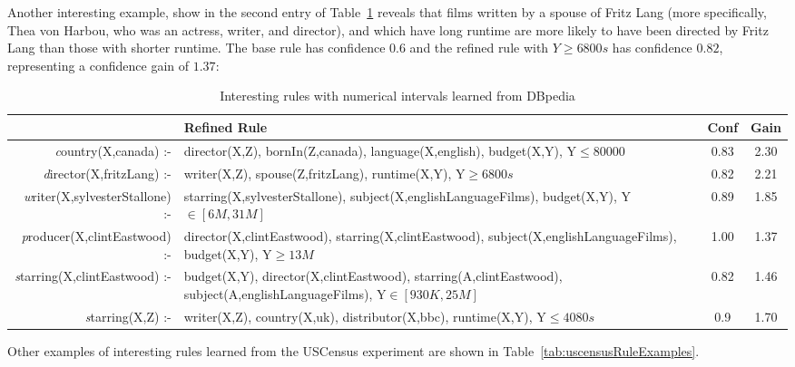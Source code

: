 Another interesting example, show  in the second entry of Table~\ref{tab:mdbRuleExamples} reveals that films written by
a spouse of Fritz Lang (more specifically, Thea von Harbou, who was an actress, writer, and director), and which have
long runtime are more likely to have been directed by Fritz Lang than those with shorter runtime. The base rule has
confidence $0.6$ and the refined rule with $Y\geq 6800s$ has confidence $0.82$, representing a confidence gain of
$1.37$:

\begin{table}[h!]
 \begin{center}
 \caption{Interesting rules with numerical intervals learned from DBpedia}
  \begin{tabular}{ >{\emph}r >{\raggedright}p{7cm} | c | c }
    \toprule
      & Refined Rule				& Conf 	& Gain \\
    \midrule
      country(X,canada) :-&director(X,Z), bornIn(Z,canada), language(X,english), budget(X,Y), Y$\leq 80000$ &
      0.83	& 2.30 \\ \hline
      director(X,fritzLang) :-&writer(X,Z), spouse(Z,fritzLang), runtime(X,Y), Y$\geq 6800s$ & 
      0.82	& 2.21 \\ \hline
      writer(X,sylvesterStallone) :-&starring(X,sylvesterStallone), subject(X,englishLanguageFilms),
      budget(X,Y), Y$\in [6M,31M]$ &
      0.89	& 1.85 \\ \hline
      producer(X,clintEastwood) :-&director(X,clintEastwood), starring(X,clintEastwood),
      subject(X,englishLanguageFilms), budget(X,Y), Y$\geq 13M$ &
      1.00	& 1.37 \\ \hline
      starring(X,clintEastwood) :- &budget(X,Y), director(X,clintEastwood), starring(A,clintEastwood), 
      subject(A,englishLanguageFilms), Y$\in [930K,25M]$&
      0.82	& 1.46 \\ \hline
      starring(X,Z) :-&writer(X,Z), country(X,uk), distributor(X,bbc), runtime(X,Y), Y$\leq 4080s$ &
      0.9	& 1.70 \\ \hline

    \bottomrule
  \end{tabular}
  \label{tab:mdbRuleExamples}
 \end{center}
\end{table}

Other examples of interesting rules learned from the USCensus experiment are shown in
Table~\ref{tab:uscensusRuleExamples}.

